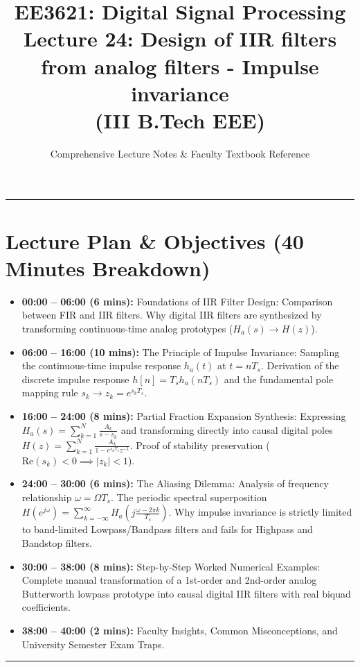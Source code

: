 \documentclass[11pt,a4paper]{article}
\title{\textbf{EE3621: Digital Signal Processing} \\ \Large Lecture 24: Design of IIR filters from analog filters - Impulse invariance \\ \large (III B.Tech EEE)}
\author{Comprehensive Lecture Notes \& Faculty Textbook Reference}
\date{}
\begin{document}
\maketitle

\noindent\rule{\textwidth}{0.5pt}

\section*{Lecture Plan \& Objectives (40 Minutes Breakdown)}
\begin{itemize}
    \item \textbf{00:00 -- 06:00 (6 mins):} Foundations of IIR Filter Design: Comparison between FIR and IIR filters. Why digital IIR filters are synthesized by transforming continuous-time analog prototypes ($H_a(s) \to H(z)$).
    \item \textbf{06:00 -- 16:00 (10 mins):} The Principle of Impulse Invariance: Sampling the continuous-time impulse response $h_a(t)$ at $t = n T_s$. Derivation of the discrete impulse response $h[n] = T_s h_a(n T_s)$ and the fundamental pole mapping rule $s_k \to z_k = e^{s_k T_s}$.
    \item \textbf{16:00 -- 24:00 (8 mins):} Partial Fraction Expansion Synthesis: Expressing $H_a(s) = \sum_{k=1}^N \frac{A_k}{s - s_k}$ and transforming directly into causal digital poles $H(z) = \sum_{k=1}^N \frac{A_k}{1 - e^{s_k T_s} z^{-1}}$. Proof of stability preservation ($\text{Re}(s_k) < 0 \implies |z_k| < 1$).
    \item \textbf{24:00 -- 30:00 (6 mins):} The Aliasing Dilemma: Analysis of frequency relationship $\omega = \Omega T_s$. The periodic spectral superposition $H(e^{j\omega}) = \sum_{k=-\infty}^\infty H_a\left(j\frac{\omega - 2\pi k}{T_s}\right)$. Why impulse invariance is strictly limited to band-limited Lowpass/Bandpass filters and fails for Highpass and Bandstop filters.
    \item \textbf{30:00 -- 38:00 (8 mins):} Step-by-Step Worked Numerical Examples: Complete manual transformation of a 1st-order and 2nd-order analog Butterworth lowpass prototype into causal digital IIR filters with real biquad coefficients.
    \item \textbf{38:00 -- 40:00 (2 mins):} Faculty Insights, Common Misconceptions, and University Semester Exam Traps.
\end{itemize}

\noindent\rule{\textwidth}{0.5pt}
\end{document}
